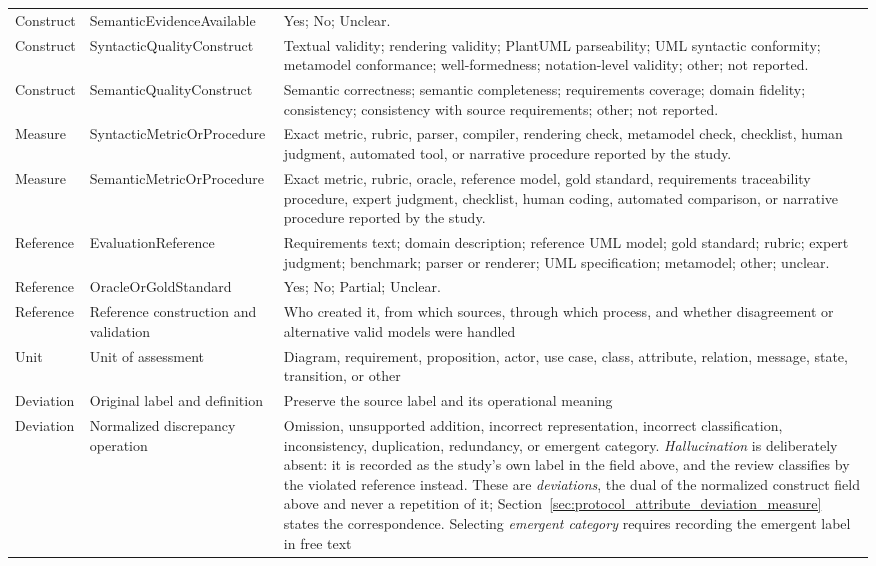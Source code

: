 \begin{longtable}{p{} p{} p{}}
Construct & SemanticEvidenceAvailable & Yes; No; Unclear. \\
Construct & SyntacticQualityConstruct & Textual validity; rendering validity; PlantUML parseability; UML syntactic conformity; metamodel conformance; well-formedness; notation-level validity; other; not reported. \\
Construct & SemanticQualityConstruct & Semantic correctness; semantic completeness; requirements coverage; domain fidelity; consistency; consistency with source requirements; other; not reported. \\
Measure & SyntacticMetricOrProcedure & Exact metric, rubric, parser, compiler, rendering check, metamodel check, checklist, human judgment, automated tool, or narrative procedure reported by the study. \\
Measure & SemanticMetricOrProcedure & Exact metric, rubric, oracle, reference model, gold standard, requirements traceability procedure, expert judgment, checklist, human coding, automated comparison, or narrative procedure reported by the study. \\
Reference & EvaluationReference & Requirements text; domain description; reference UML model; gold standard; rubric; expert judgment; benchmark; parser or renderer; UML specification; metamodel; other; unclear. \\
Reference & OracleOrGoldStandard & Yes; No; Partial; Unclear. \\
Reference & Reference construction and validation & Who created it, from which sources, through which process, and whether disagreement or alternative valid models were handled \\
Unit & Unit of assessment & Diagram, requirement, proposition, actor, use case, class, attribute, relation, message, state, transition, or other \\
Deviation & Original label and definition & Preserve the source label and its operational meaning \\
Deviation & Normalized discrepancy operation & Omission, unsupported addition, incorrect representation, incorrect classification, inconsistency, duplication, redundancy, or emergent category. \textit{Hallucination} is deliberately absent: it is recorded as the study's own label in the field above, and the review classifies by the violated reference instead. These are \textit{deviations}, the dual of the normalized construct field above and never a repetition of it; Section~\ref{sec:protocol_attribute_deviation_measure} states the correspondence. Selecting \textit{emergent category} requires recording the emergent label in free text \\

\end{longtable}
